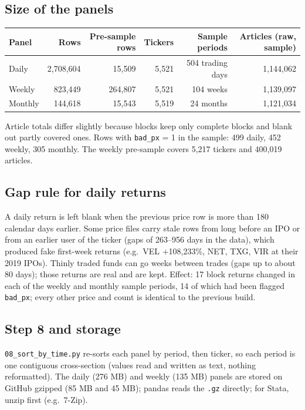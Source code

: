 \documentclass[11pt]{article}
\newcommand{\var}[1]{\texttt{#1}}
\begin{document}
\subsection{Size of the panels}
\begin{center}\small
\begin{tabular}{@{}lrrrrr@{}}
\toprule
Panel & Rows & Pre-sample rows & Tickers & Sample periods & Articles (raw, sample)\\
\midrule
Daily & 2,708,604 & 15,509 & 5,521 & 504 trading days & 1,144,062\\
Weekly & 823,449 & 264,807 & 5,521 & 104 weeks & 1,139,097\\
Monthly & 144,618 & 15,543 & 5,519 & 24 months & 1,121,034\\
\bottomrule
\end{tabular}
\end{center}
Article totals differ slightly because blocks keep only complete blocks and blank out partly covered ones. Rows with \var{bad\_px} = 1 in the sample: 499 daily, 452 weekly, 305 monthly. The weekly pre-sample covers 5,217 tickers and 400,019 articles.

\subsection{Gap rule for daily returns}\label{sec:gap}
A daily return is left blank when the previous price row is more than 180 calendar days earlier. Some price files carry stale rows from long before an IPO or from an earlier user of the ticker (gaps of 263--956 days in the data), which produced fake first-week returns (e.g.\ VEL $+$108,233\%, NET, TXG, VIR at their 2019 IPOs). Thinly traded funds can go weeks between trades (gaps up to about 80 days); those returns are real and are kept. Effect: 17 block returns changed in each of the weekly and monthly sample periods, 14 of which had been flagged \var{bad\_px}; every other price and count is identical to the previous build.

\subsection{Step 8 and storage}
\var{08\_sort\_by\_time.py} re-sorts each panel by period, then ticker, so each period is one contiguous cross-section (values read and written as text, nothing reformatted). The daily (276 MB) and weekly (135 MB) panels are stored on GitHub gzipped (85 MB and 45 MB); pandas reads the \var{.gz} directly; for Stata, unzip first (e.g.\ 7-Zip).
\end{document}
